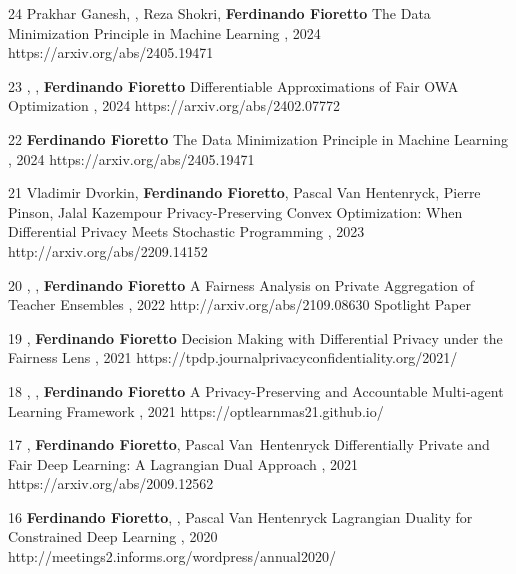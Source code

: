 \begin{pubs}
\wsentry
	{24}
	{Prakhar Ganesh, , Reza Shokri, {\bf Ferdinando Fioretto}}
	{The Data Minimization Principle in Machine Learning}
	{, 2024}
	{https://arxiv.org/abs/2405.19471}

\wsentry
	{23}
	{, , {\bf Ferdinando Fioretto}}
	{Differentiable Approximations of Fair OWA Optimization}
	{, 2024}
	{https://arxiv.org/abs/2402.07772}

\wsentry
	{22}
	{{\bf Ferdinando Fioretto}}
	{The Data Minimization Principle in Machine Learning}
	{, 2024}
	{https://arxiv.org/abs/2405.19471}

\wsentry 
	{21}%
	{Vladimir Dvorkin, {\bf Ferdinando Fioretto}, Pascal Van Hentenryck, Pierre Pinson, Jalal Kazempour}
	{Privacy-Preserving Convex Optimization: When Differential Privacy Meets Stochastic Programming}
	{, 2023}
	{http://arxiv.org/abs/2209.14152}


	\wsentryAwd
	{20} %
	{, , {\bf Ferdinando Fioretto}}
	{A Fairness Analysis on Private Aggregation of Teacher Ensembles}
	{, 2022}
	{http://arxiv.org/abs/2109.08630}
	{Spotlight Paper}
	
	\wsentry
	{19} %
	{, {\bf Ferdinando Fioretto}}
	{Decision Making with Differential Privacy under the Fairness Lens}
	{, 2021}
	{https://tpdp.journalprivacyconfidentiality.org/2021/}
 	
	\wsentry
	{18} %
	{, , {\bf Ferdinando Fioretto}}
	{A Privacy-Preserving and Accountable Multi-agent Learning Framework}
	{, 2021}
	{https://optlearnmas21.github.io/}

	\wsentry
	{17} %
	{, {\bf Ferdinando Fioretto}, Pascal Van~Hentenryck}
	{Differentially Private and Fair Deep Learning: A Lagrangian Dual Approach}
	{, 2021}
	{https://arxiv.org/abs/2009.12562}

\wsentry 
	{16} %
	{{\bf Ferdinando Fioretto}, , Pascal Van Hentenryck}
	{Lagrangian Duality for Constrained Deep Learning}
	{, 2020}
	{http://meetings2.informs.org/wordpress/annual2020/}


\end{pubs}
